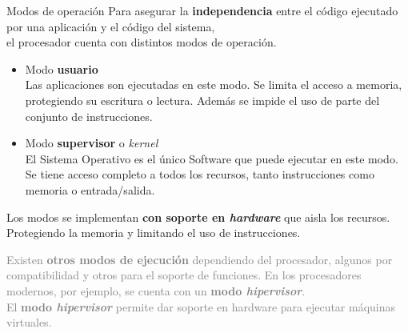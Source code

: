 \documentclass[aspectratio=169]{beamer}
\begin{document}
\begin{frame}{Modos de operación}
    \small
    Para asegurar la \textbf{independencia} entre el código ejecutado por una aplicación y el código del sistema,\\
    el procesador cuenta con distintos modos de operación.
    \begin{itemize}
      \item[] Modo \textbf{usuario}\\
      {\footnotesize \textcolor{verdeuca}{Las aplicaciones son ejecutadas en este modo. Se limita el acceso a memoria, protegiendo su escritura o lectura.
      Además se impide el uso de parte del conjunto de instrucciones.}}
      \item[] Modo \textbf{supervisor} o \emph{kernel}\\
      {\footnotesize \textcolor{verdeuca}{El Sistema Operativo es el único Software que puede ejecutar en este modo. Se tiene acceso completo a todos los recursos, tanto instrucciones como memoria o entrada/salida.}}
    \end{itemize}
    \pause
    \begin{tcolorbox}[size=small,width=\textwidth,sharp corners,title={}]
    \footnotesize
    \begin{center}
    \normalsize Los modos se implementan \textbf{con soporte en \emph{hardware}} que aisla los recursos.\\
    Protegiendo la memoria y limitando el uso de instrucciones.
    \end{center}
    \end{tcolorbox}
    \medskip
    \small
    \pause
    \textcolor{gray}{Existen \textbf{otros modos de ejecución} dependiendo del procesador, algunos por compatibilidad y otros para el soporte de funciones.
    En los procesadores modernos, por ejemplo, se cuenta con un \textbf{modo \emph{hipervisor}}.}\\
    \medskip
    \textcolor{gray}{El \textbf{modo \emph{hipervisor}} permite dar soporte en hardware para ejecutar máquinas virtuales.}
\end{frame}
\end{document}
